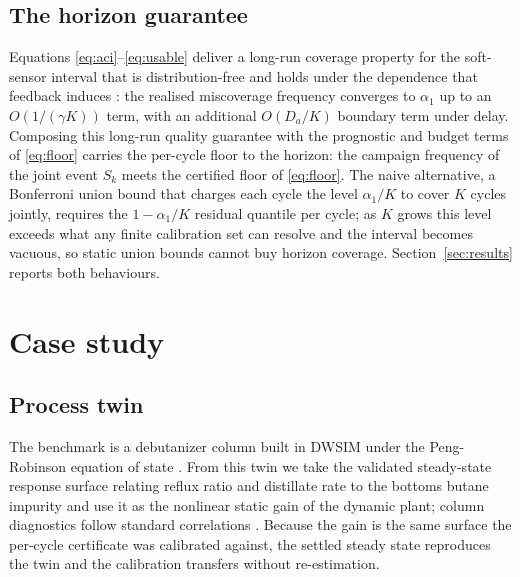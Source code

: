 \documentclass[review,12pt]{elsarticle}
\begin{document}
\subsection{The horizon guarantee}
\label{sec:horizon}

Equations \eqref{eq:aci}--\eqref{eq:usable} deliver a long-run coverage property for the
soft-sensor interval that is distribution-free and holds under the dependence that feedback
induces \citep{gibbs2021}: the realised miscoverage frequency converges to $\alpha_1$ up to an
$O(1/(\gamma K))$ term, with an additional $O(D_a/K)$ boundary term under delay. Composing this
long-run quality guarantee with the prognostic and budget terms of \eqref{eq:floor} carries the
per-cycle floor to the horizon: the campaign frequency of the joint event $S_k$ meets the
certified floor of \eqref{eq:floor}. The naive alternative, a Bonferroni union bound that
charges each cycle the level $\alpha_1/K$ to cover $K$ cycles jointly, requires the
$1-\alpha_1/K$ residual quantile per cycle; as $K$ grows this level exceeds what any finite
calibration set can resolve and the interval becomes vacuous, so static union bounds cannot buy
horizon coverage. Section~\ref{sec:results} reports both behaviours.
\section{Case study}
\label{sec:case}

\subsection{Process twin}
The benchmark is a debutanizer column built in DWSIM \citep{dwsim} under the Peng-Robinson
equation of state \citep{peng1976}. From this twin we take the validated steady-state response
surface relating reflux ratio and distillate rate to the bottoms butane impurity
\citep{busico_m3} and use it as the nonlinear static gain of the dynamic plant; column
diagnostics follow standard correlations \citep{perrys}. Because the gain is the same surface
the per-cycle certificate was calibrated against, the settled steady state reproduces the twin
and the calibration transfers without re-estimation.
\end{document}
